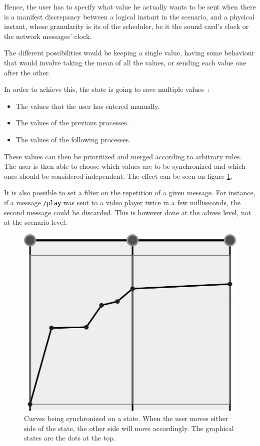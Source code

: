\documentclass{sigchi}
\begin{document}
Hence, the user has to specify what value he actually wants to be sent when there is a manifest discrepancy between a logical instant in the scenario, and a physical instant, whose granularity is its of the scheduler, be it the sound card's clock or the network messages' clock.

The different possibilities would be keeping a single value, having some behaviour that would involve taking the mean of all the values, or sending each value one after the other.

In order to achieve this, the state is going to save multiple values~: 
\begin{itemize}
	\item The values that the user has entered manually.
	\item The values of the previous processes.
	\item The values of the following processes.
\end{itemize}

These values can then be prioritized and merged according to arbitrary rules. The user is then able to choose which values are to be synchronized and which ones should be considered independent. The effect can be seen on figure \ref{fig.curvesync}.

It is also possible to set a filter on the repetition of a given message. For instance, if a message \texttt{/play} was sent to a video player twice in a few milliseconds, the second message could be discarded. This is however done at the adress level, not at the scenario level. 

\begin{figure}[h]
	\centering
	\includegraphics[scale=0.2]{images/curvesync.png}
	\caption{Curves being synchronized on a state. When the user moves either side of the state, the other side will move accordingly. The graphical states are the dots at the top.}
	\label{fig.curvesync}
\end{figure}
\end{document}
